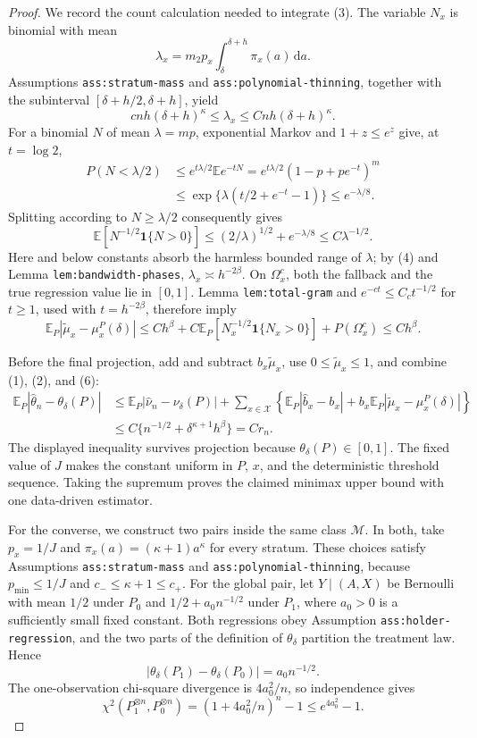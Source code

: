 \documentclass{article}
\begin{document}
\begin{proof}
We record the count calculation needed to integrate (3).  The variable \(N_x\) is binomial with mean
\[
 \lambda_x=m_2p_x\int_\delta^{\delta+h}\pi_x(a)\,\mathrm da.
\]
Assumptions \texttt{ass:stratum-mass} and \texttt{ass:polynomial-thinning}, together with the subinterval \([\delta+h/2,\delta+h]\), yield
\[
 cnh(\delta+h)^\kappa\leq\lambda_x\leq Cnh(\delta+h)^\kappa. \tag{4}
\]
For a binomial \(N\) of mean \(\lambda=mp\), exponential Markov and \(1+z\leq e^z\) give, at \(t=\log2\),
\[
 \begin{aligned}
 P(N<\lambda/2)
 &\leq e^{t\lambda/2}\mathbb E e^{-tN}
 =e^{t\lambda/2}(1-p+pe^{-t})^m\\
 &\leq\exp\{\lambda(t/2+e^{-t}-1)\}
 \leq e^{-\lambda/8}.
 \end{aligned}
\]
Splitting according to \(N\geq\lambda/2\) consequently gives
\[
 \mathbb E[N^{-1/2}\mathbf 1\{N>0\}]
 \leq (2/\lambda)^{1/2}+e^{-\lambda/8}
 \leq C\lambda^{-1/2}. \tag{5}
\]
Here and below constants absorb the harmless bounded range of \(\lambda\); by (4) and Lemma \texttt{lem:bandwidth-phases}, \(\lambda_x\asymp h^{-2\beta}\).  On \(\Omega_x^c\), both the fallback and the true regression value lie in \([0,1]\).  Lemma \texttt{lem:total-gram} and \(e^{-ct}\leq C_ct^{-1/2}\) for \(t\geq1\), used with \(t=h^{-2\beta}\), therefore imply
\[
 \mathbb E_P|\widetilde\mu_x-\mu_x^P(\delta)|
 \leq Ch^\beta+C\mathbb E_P[N_x^{-1/2}\mathbf 1\{N_x>0\}]
       +P(\Omega_x^c)
 \leq Ch^\beta. \tag{6}
\]

Before the final projection, add and subtract \(b_x\widetilde\mu_x\), use \(0\leq\widetilde\mu_x\leq1\), and combine (1), (2), and (6):
\[
 \begin{aligned}
 \mathbb E_P|\widehat\theta_n-\theta_\delta(P)|
 &\leq \mathbb E_P|\widehat\nu_n-\nu_\delta(P)|
 +\sum_{x\in\mathcal X}\left\{\mathbb E_P|\widehat b_x-b_x|
 +b_x\mathbb E_P|\widetilde\mu_x-\mu_x^P(\delta)|\right\}\\
 &\leq C\{n^{-1/2}+\delta^{\kappa+1}h^\beta\}=Cr_n. 
 \end{aligned} \tag{7}
\]
The displayed inequality survives projection because \(\theta_\delta(P)\in[0,1]\).  The fixed value of \(J\) makes the constant uniform in \(P\), \(x\), and the deterministic threshold sequence.  Taking the supremum proves the claimed minimax upper bound with one data-driven estimator.

For the converse, we construct two pairs inside the same class \(\mathcal M\).  In both, take \(p_x=1/J\) and \(\pi_x(a)=(\kappa+1)a^\kappa\) for every stratum.  These choices satisfy Assumptions \texttt{ass:stratum-mass} and \texttt{ass:polynomial-thinning}, because \(p_{\min}\leq1/J\) and \(c_-\leq\kappa+1\leq c_+\).  For the global pair, let \(Y\mid(A,X)\) be Bernoulli with mean \(1/2\) under \(P_0\) and \(1/2+a_0n^{-1/2}\) under \(P_1\), where \(a_0>0\) is a sufficiently small fixed constant.  Both regressions obey Assumption \texttt{ass:holder-regression}, and the two parts of the definition of \(\theta_\delta\) partition the treatment law.  Hence
\[
 |\theta_\delta(P_1)-\theta_\delta(P_0)|=a_0n^{-1/2}. \tag{8}
\]
The one-observation chi-square divergence is \(4a_0^2/n\), so independence gives
\[
 \chi^2(P_1^{\otimes n},P_0^{\otimes n})
 =(1+4a_0^2/n)^n-1\leq e^{4a_0^2}-1. \tag{9}
\]


\end{proof}
\end{document}
